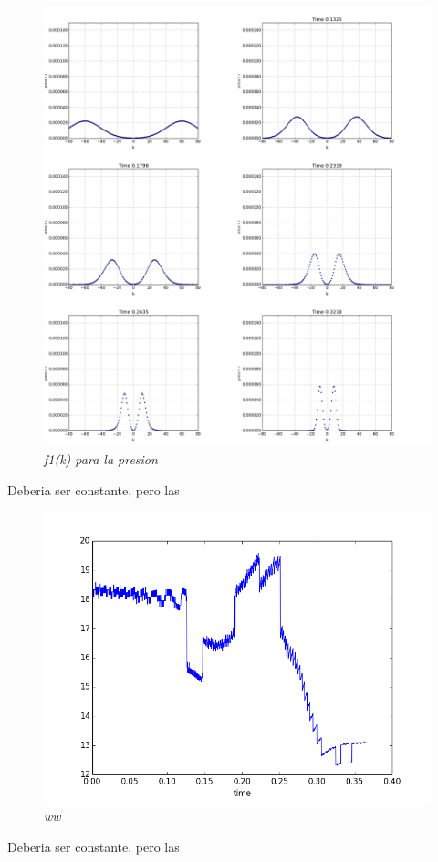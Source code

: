 \documentclass{article}
\begin{document}
\begin{description}
\item \begin{figure}[!ht]
 \centering
 \includegraphics[scale=0.2]{pfourinhom1.png}
 \caption{\emph{f1(k) para la presion}}
\end{figure}
\item Deberia ser constante, pero las 

\item \begin{figure}[!ht]
 \centering
 \includegraphics[scale=0.2]{wwinhom1.png}
 \caption{\emph{ww}}
\end{figure}

\item Deberia ser constante, pero las 
\end{description}
\end{document}
